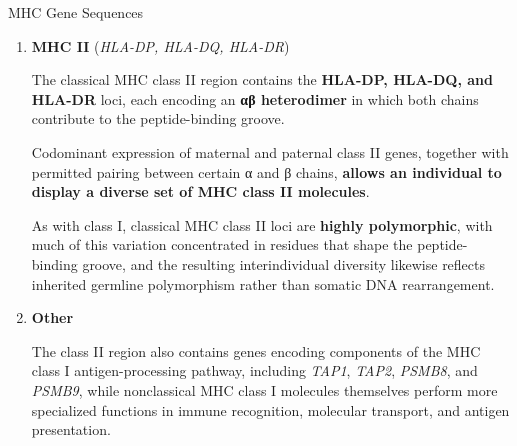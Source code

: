 \begin{core}{MHC Gene Sequences}
\begin{enumerate}
        \item \textbf{MHC II} (\textit{HLA-DP, HLA-DQ, HLA-DR})

          The classical MHC class II region contains the \textbf{HLA-DP, HLA-DQ, and HLA-DR} loci, each encoding an \textbf{αβ heterodimer} in which both chains contribute to the peptide-binding groove.

          Codominant expression of maternal and paternal class II genes, together with permitted pairing between certain α and β chains, \textbf{allows an individual to display a diverse set of MHC class II molecules}.

          As with class I, classical MHC class II loci are \textbf{highly polymorphic}, with much of this variation concentrated in residues that shape the peptide-binding groove, and the resulting interindividual diversity likewise reflects inherited germline polymorphism rather than somatic DNA rearrangement.

        \item \textbf{Other}

          The class II region also contains genes encoding components of the MHC class I antigen-processing pathway, including \textit{TAP1}, \textit{TAP2}, \textit{PSMB8}, and \textit{PSMB9}, while nonclassical MHC class I molecules themselves perform more specialized functions in immune recognition, molecular transport, and antigen presentation.

      \end{enumerate}

    \end{core}
    
